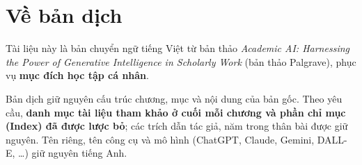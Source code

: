 \documentclass[
  oneside, titlepage, numbers=noenddot, headinclude,
  footinclude=true, cleardoublepage=empty, abstractoff,
  BCOR=5mm, paper=a4, fontsize=11pt
]{scrreprt}
\begin{document}
\frenchspacing
\raggedbottom
{}
\pagestyle{plain}

\thispagestyle{empty}
\section*{Về bản dịch}
Tài liệu này là bản chuyển ngữ tiếng Việt từ bản thảo \emph{Academic AI: Harnessing the Power of Generative Intelligence in Scholarly Work} (bản thảo Palgrave), phục vụ \textbf{mục đích học tập cá nhân}.

Bản dịch giữ nguyên cấu trúc chương, mục và nội dung của bản gốc. Theo yêu cầu, \textbf{danh mục tài liệu tham khảo ở cuối mỗi chương và phần chỉ mục (Index) đã được lược bỏ}; các trích dẫn tác giả, năm trong thân bài được giữ nguyên. Tên riêng, tên công cụ và mô hình (ChatGPT, Claude, Gemini, DALL-E, \dots) giữ nguyên tiếng Anh.

\pagestyle{scrheadings}
\tableofcontents
\cleardoublepage
{}











\end{document}
